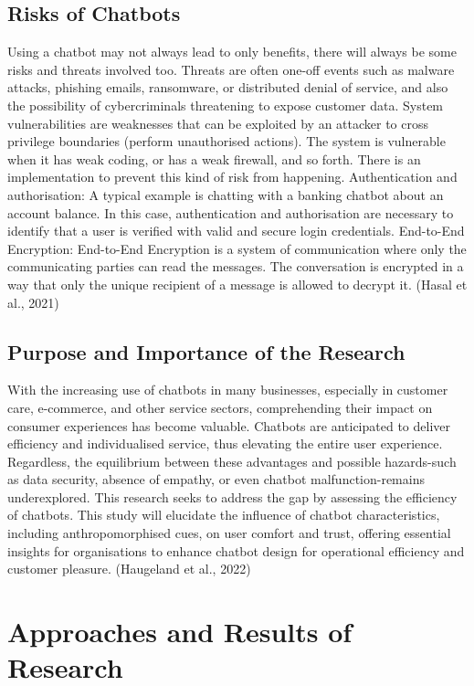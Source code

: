 \documentclass[a4paper]{article}
\begin{document}
\subsection{Risks of Chatbots}

Using a chatbot may not always lead to only benefits, there will always be some risks and threats involved too.
Threats are often one-off events such as malware attacks, phishing emails, ransomware, or distributed denial of service, and also the possibility of cybercriminals threatening to expose customer data. System vulnerabilities are weaknesses that can be exploited by an attacker to cross privilege boundaries (perform unauthorised actions). The system is vulnerable when it has weak coding, or has a weak firewall, and so forth. There is an implementation to prevent this kind of risk from happening.
Authentication and authorisation: A typical example is chatting with a banking chatbot about an account balance. In this case, authentication and authorisation are necessary to identify that a user is verified with valid and secure login credentials. 
End-to-End Encryption: End-to-End Encryption is a system of communication where only the communicating parties can read the messages. The conversation is encrypted in a way that only the unique recipient of a message is allowed to decrypt it. (Hasal et al., 2021) \cite{chatbots}


\subsection{Purpose and Importance of the Research}

With the increasing use of chatbots in many businesses, especially in customer care, e-commerce, and other service sectors, comprehending their impact on consumer experiences has become valuable. Chatbots are anticipated to deliver efficiency and individualised service, thus elevating the entire user experience. Regardless, the equilibrium between these advantages and possible hazards-such as data security, absence of empathy, or even chatbot malfunction-remains underexplored. This research seeks to address the gap by assessing the efficiency of chatbots. This study will elucidate the influence of chatbot characteristics, including anthropomorphised cues, on user comfort and trust, offering essential insights for organisations to enhance chatbot design for operational efficiency and customer pleasure. (Haugeland et al., 2022) \cite {chatbotimpact}

\section{Approaches and Results of Research}
\end{document}
